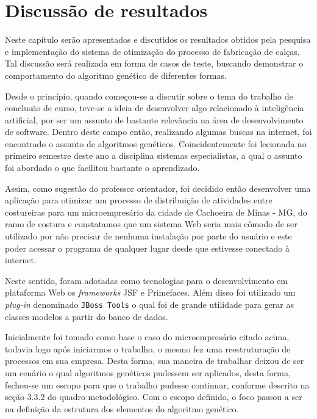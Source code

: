 \chapter{Discussão de resultados}

\par Neste capítulo serão apresentados e discutidos os resultados obtidos pela pesquisa e implementação 
do sistema de otimização do processo de fabricação de calças. Tal discussão será realizada em forma de
casos de teste, buscando demonstrar o comportamento do algoritmo genético de diferentes formas.

\par Desde o princípio, quando começou-se a discutir sobre o tema do 
trabalho de conclusão de curso, teve-se a ideia de desenvolver algo relacionado
à inteligência artificial, por ser um assunto de bastante relevância na área de desenvolvimento de software. 
Dentro deste campo então, realizando algumas buscas na internet, foi encontrado
o assunto de algoritmos genéticos.
Coincidentemente foi lecionada no primeiro semestre deste ano a disciplina
sistemas especialistas, a qual o assunto foi abordado o que facilitou bastante o aprendizado.

\par Assim, como sugestão do professor orientador, foi decidido então
desenvolver uma aplicação para otimizar um processo de distribuição de atividades entre
costureiras para um microempresário da cidade de Cachoeira de Minas - MG, do ramo de costura e constatamos 
que um sistema Web seria mais cômodo de ser utilizado por não precisar de
nenhuma instalação por parte do usuário e este poder acessar o programa de
qualquer lugar desde que estivesse conectado à internet.

\par Neste sentido, foram adotadas como tecnologias para o desenvolvimento em
plataforma Web os \textit{frameworks} JSF e Primefaces. Além disso foi utilizado
um \textit{plug-in} denominado \texttt{JBoss Tools} o qual foi de grande utilidade para gerar as classes 
modelos a partir do banco de dados.

\par Inicialmente foi tomado como base o caso do microempresário citado acima,
todavia logo após iniciarmos o trabalho, o mesmo fez uma reestruturação de processos em sua empresa. 
Desta forma, sua maneira de trabalhar deixou de ser um cenário o qual algoritmos genéticos
pudessem ser aplicados, desta forma, fechou-se um escopo para que o trabalho
pudesse continuar, conforme descrito na seção 3.3.2 do quadro metodológico. Com
o escopo definido, o foco passou a ser na definição da estrutura dos elementos do algoritmo genético.



